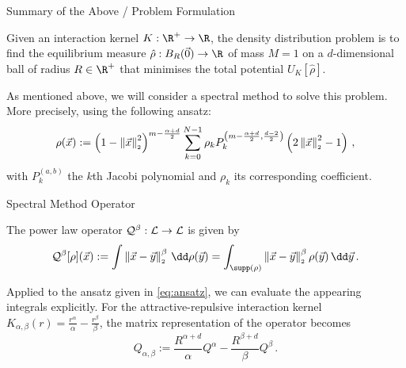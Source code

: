 \documentclass[aspectratio=169, hyperref={colorlinks=true}]{beamer}
\begin{document}
  \begin{frame}{Summary of the Above / Problem Formulation}
    \begin{definition}
      Given an interaction kernel $K: \R^+ \to \R$, the density distribution problem is to find the equilibrium measure $\hat{\rho}: B_R(\vec{0}) \to \R$ of mass $M = 1$ on a $d$-dimensional ball of radius $R \in \R^+$ that minimises the total potential $U_K[\hat{\rho}]$.
    \end{definition}
    \pause

    As mentioned above, we will consider a \alert{spectral method} to solve this problem. More precisely, using the following ansatz:
    \begin{equation}
      \rho(\vec{x}) := \left(1-\left\lVert\vec{x}\right\rVert_{\scriptscriptstyle 2}^{2}\right)^{m - \frac{\alpha + d}{2}} \sum_{k=0}^{N-1} \rho_k P_{k}^{\left(m - \frac{\alpha + d}{2},\frac{d-2}{2}\right)}\left(2 \left\lVert\vec{x}\right\rVert_{\scriptscriptstyle 2}^{2}-1\right)\,,
      \label{eq:ansatz}
    \end{equation}
    with $P_k^{(a, b)}$ the $k$th Jacobi polynomial and $\rho_k$ its corresponding coefficient.
  \end{frame}

  \begin{frame}{Spectral Method Operator}
    \begin{definition}
      The power law operator $\mathcal{Q}^\beta: \mathcal{L} \to \mathcal{L}$ is given by
      $$\mathcal{Q}^\beta[\rho](\vec{x}) := \int \norm{\vec{x}-\vec{y}}^\beta \,\dd\rho(\vec{y}) = \int_{\supp(\rho)} \norm{\vec{x}-\vec{y}}^\beta \rho(\vec{y}) \,\dd\vec{y}\,.$$
    \end{definition}

    Applied to the ansatz given in \eqref{eq:ansatz}, we can evaluate the appearing integrals \alert{explicitly}.
    For the attractive-repulsive interaction kernel $K_{\alpha,\beta}(r) = \frac{r^\alpha}{\alpha} - \frac{r^\beta}{\beta}$, the matrix representation of the operator becomes
    \begin{equation}
      Q_{\alpha, \beta} := \frac{R^{\alpha+d}}{\alpha} Q^\alpha - \frac{R^{\beta+d}}{\beta} Q^\beta\,.
      \label{eq:full-attrep-operator}
    \end{equation}
  \end{frame}
\end{document}
